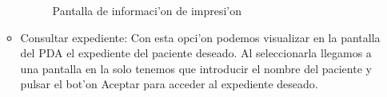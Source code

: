 \begin{enumerate}
\begin{itemize}
\begin{figure}[h!]
	\begin{center}
     	\end{center}
    	\caption{Pantalla de informaci'on de impresi'on}\label{fig:acierto_imprimir}
\end{figure}

\item Consultar expediente:\newline
Con esta opci'on podemos visualizar en la pantalla del PDA el expediente del paciente deseado. Al seleccionarla llegamos a  una pantalla en la solo tenemos que introducir el nombre del paciente y pulsar el bot'on Aceptar para acceder al expediente deseado.


\end{itemize}
\end{enumerate}
